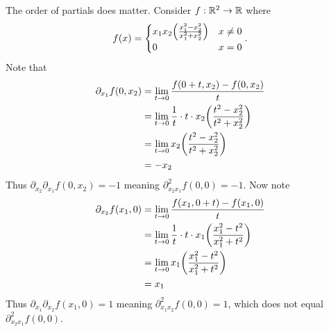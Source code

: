 \documentclass[../main.tex]{subfiles}
\begin{document}
\begin{example}
    The order of partials does matter. Consider $f : \mathbb{R}^2 \to \mathbb{R}$ where
    \[
        f(x) = \begin{cases}
            x_1 x_2 \qty(\frac{x_1^2 - x_2^2}{x_1^2 + x_2^2}) & x \neq 0 \\
            0                                                 & x = 0
        \end{cases}
    .\]
    Note that
    \begin{align*}
        \partial_{x_1} f(0, x_2) &= \lim_{t \to 0} \frac{f(0 + t, x_2) - f(0,x_2)}{t} \\ 
                                 &= \lim_{t \to 0} \frac{1}{t} \cdot t \cdot x_2 \qty(\frac{t^2 - x_2^2}{t^2 + x_2^2}) \\
                                 &= \lim_{t \to 0} x_2 \qty(\frac{t^2 - x_2^2}{t^2 + x_2^2}) \\
                                 &= -x_2
    \end{align*}
    Thus $\partial_{x_2} \partial_{x_1} f(0, x_2) = -1$ meaning $\partial^2_{x_2 x_1} f(0,0) = -1$. Now note
    \begin{align*}
        \partial_{x_2} f(x_1, 0) &= \lim_{t \to 0} \frac{f(x_1, 0 + t) - f(x_1, 0)}{t} \\
        &= \lim_{t \to 0} \frac{1}{t} \cdot t \cdot x_1 \qty(\frac{x_1^2 - t^2}{x_1^2 + t^2}) \\
        &= \lim_{t \to 0} x_1 \qty(\frac{x_1^2 - t^2}{x_1^2 + t^2}) \\
        &= x_1
    \end{align*}
    Thus $\partial_{x_1} \partial_{x_2} f(x_1, 0) = 1$ meaning $\partial^2_{x_1 x_2} f(0,0) = 1$, which does not equal $\partial^2_{x_2 x_1} f(0,0)$.
\end{example}
\end{document}
